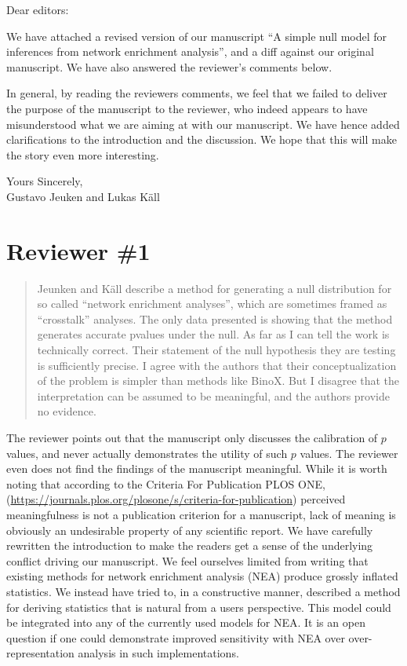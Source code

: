 \documentclass[a4paper]{article}
\newcommand{\breview}{\begin{quotation}\begin{bf}\noindent}
\newcommand{\ereview}{\end{bf}\end{quotation}}
\begin{document}
Dear editors:

We have attached a revised version of our manuscript ``A simple null model for inferences from network enrichment analysis'', and a diff
against our original manuscript. We have also answered the reviewer's comments
below.

In general, by reading the reviewers comments, we feel that we failed to deliver the purpose of the manuscript to the reviewer, who indeed appears to have misunderstood what we are aiming at with our manuscript. We have hence added clarifications to the introduction and the discussion. We hope that this will make the story even more interesting.

Yours Sincerely,\\[1.5cm]
Gustavo Jeuken and
Lukas K\"{a}ll
\\


\section*{Reviewer \#1}
\breview
Jeunken and Käll describe a method for generating a null distribution for so called ``network enrichment analyses'', which are sometimes framed as ``crosstalk'' analyses. The only data presented is showing that the method generates accurate pvalues under the null.
\medskip
As far as I can tell the work is technically correct. Their statement of the null hypothesis they are testing is sufficiently precise. I agree with the authors that their conceptualization of the problem is simpler than methods like BinoX. But I disagree that the interpretation can be assumed to be meaningful, and the authors provide no evidence.
\ereview
The reviewer points out that the manuscript only discusses the calibration of $p$ values, and never actually demonstrates the utility of such $p$ values. The reviewer even does not find the findings of the manuscript meaningful. While it is worth noting that  according to the Criteria For Publication PLOS ONE, (\url{https://journals.plos.org/plosone/s/criteria-for-publication}) perceived meaningfulness is not a publication criterion for a manuscript, lack of meaning is obviously an undesirable property of any scientific report. We have carefully rewritten the introduction to make the readers get a sense of the underlying conflict driving our manuscript. We feel ourselves limited from writing that existing methods for network enrichment analysis (NEA) produce grossly inflated statistics. We instead have tried to, in a constructive manner, described a method for deriving statistics that is natural from a users perspective. This model could be integrated into any of the currently used  models for NEA. It is an open question if one could demonstrate improved sensitivity with NEA over over-representation analysis in such implementations.
\end{document}
